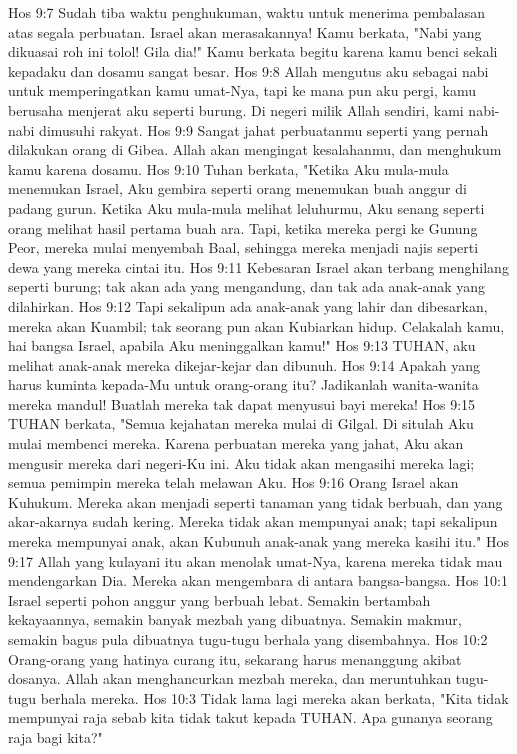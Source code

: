 Hos 9:7  Sudah tiba waktu penghukuman, waktu untuk menerima pembalasan atas segala perbuatan. Israel akan merasakannya! Kamu berkata, "Nabi yang dikuasai roh ini tolol! Gila dia!" Kamu berkata begitu karena kamu benci sekali kepadaku dan dosamu sangat besar.
Hos 9:8  Allah mengutus aku sebagai nabi untuk memperingatkan kamu umat-Nya, tapi ke mana pun aku pergi, kamu berusaha menjerat aku seperti burung. Di negeri milik Allah sendiri, kami nabi-nabi dimusuhi rakyat.
Hos 9:9  Sangat jahat perbuatanmu seperti yang pernah dilakukan orang di Gibea. Allah akan mengingat kesalahanmu, dan menghukum kamu karena dosamu.
Hos 9:10  Tuhan berkata, "Ketika Aku mula-mula menemukan Israel, Aku gembira seperti orang menemukan buah anggur di padang gurun. Ketika Aku mula-mula melihat leluhurmu, Aku senang seperti orang melihat hasil pertama buah ara. Tapi, ketika mereka pergi ke Gunung Peor, mereka mulai menyembah Baal, sehingga mereka menjadi najis seperti dewa yang mereka cintai itu.
Hos 9:11  Kebesaran Israel akan terbang menghilang seperti burung; tak akan ada yang mengandung, dan tak ada anak-anak yang dilahirkan.
Hos 9:12  Tapi sekalipun ada anak-anak yang lahir dan dibesarkan, mereka akan Kuambil; tak seorang pun akan Kubiarkan hidup. Celakalah kamu, hai bangsa Israel, apabila Aku meninggalkan kamu!"
Hos 9:13  TUHAN, aku melihat anak-anak mereka dikejar-kejar dan dibunuh.
Hos 9:14  Apakah yang harus kuminta kepada-Mu untuk orang-orang itu? Jadikanlah wanita-wanita mereka mandul! Buatlah mereka tak dapat menyusui bayi mereka!
Hos 9:15  TUHAN berkata, "Semua kejahatan mereka mulai di Gilgal. Di situlah Aku mulai membenci mereka. Karena perbuatan mereka yang jahat, Aku akan mengusir mereka dari negeri-Ku ini. Aku tidak akan mengasihi mereka lagi; semua pemimpin mereka telah melawan Aku.
Hos 9:16  Orang Israel akan Kuhukum. Mereka akan menjadi seperti tanaman yang tidak berbuah, dan yang akar-akarnya sudah kering. Mereka tidak akan mempunyai anak; tapi sekalipun mereka mempunyai anak, akan Kubunuh anak-anak yang mereka kasihi itu."
Hos 9:17  Allah yang kulayani itu akan menolak umat-Nya, karena mereka tidak mau mendengarkan Dia. Mereka akan mengembara di antara bangsa-bangsa.
Hos 10:1  Israel seperti pohon anggur yang berbuah lebat. Semakin bertambah kekayaannya, semakin banyak mezbah yang dibuatnya. Semakin makmur, semakin bagus pula dibuatnya tugu-tugu berhala yang disembahnya.
Hos 10:2  Orang-orang yang hatinya curang itu, sekarang harus menanggung akibat dosanya. Allah akan menghancurkan mezbah mereka, dan meruntuhkan tugu-tugu berhala mereka.
Hos 10:3  Tidak lama lagi mereka akan berkata, "Kita tidak mempunyai raja sebab kita tidak takut kepada TUHAN. Apa gunanya seorang raja bagi kita?"
